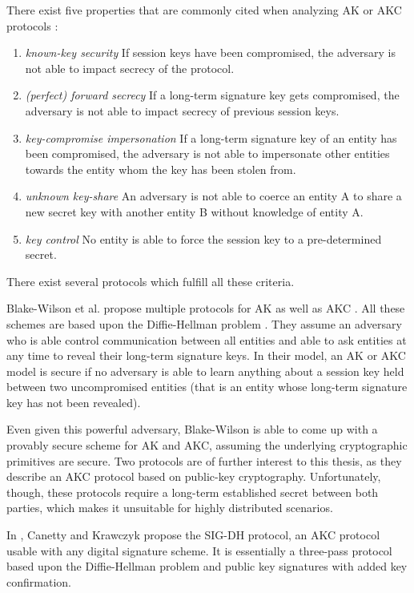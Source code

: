 There exist five properties that are commonly cited when analyzing AK or AKC protocols \cite{menezes1996handbook,blake1997key,law2003efficient}:
\begin{enumerate}
    \item \emph{known-key security}
        If session keys have been compromised, the adversary is not able to impact secrecy of the protocol.
    \item \emph{(perfect) forward secrecy}
        If a long-term signature key gets compromised, the adversary is not able to impact secrecy of previous session keys.
    \item \emph{key-compromise impersonation}
        If a long-term signature key of an entity has been compromised, the adversary is not able to impersonate other entities towards the entity whom the key has been stolen from.
    \item \emph{unknown key-share}
        An adversary is not able to coerce an entity A to share a new secret key with another entity B without knowledge of entity A.
    \item \emph{key control}
        No entity is able to force the session key to a pre-determined secret.
\end{enumerate}
There exist several protocols which fulfill all these criteria.

Blake-Wilson et al. propose multiple protocols for AK as well as AKC \cite{blake1997key}.
All these schemes are based upon the Diffie-Hellman problem \cite{diffie1976new}.
They assume an adversary who is able control communication between all entities and able to ask entities at any time to reveal their long-term signature keys.
In their model, an AK or AKC model is secure if no adversary is able to learn anything about a session key held between two uncompromised entities (that is an entity whose long-term signature key has not been revealed).

Even given this powerful adversary, Blake-Wilson is able to come up with a provably secure scheme for AK and AKC, assuming the underlying cryptographic primitives are secure.
Two protocols are of further interest to this thesis, as they describe an AKC protocol based on public-key cryptography.
Unfortunately, though, these protocols require a long-term established secret between both parties, which makes it unsuitable for highly distributed scenarios.

In \cite{canetti2001analysis}, Canetty and Krawczyk propose the SIG-DH protocol, an AKC protocol usable with any digital signature scheme.
It is essentially a three-pass protocol based upon the Diffie-Hellman problem and public key signatures with added key confirmation.

